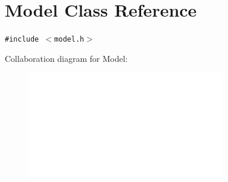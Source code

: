 \hypertarget{classModel}{
\section{Model Class Reference}
\label{classModel}
}
{\tt \#include $<$model.h$>$}

Collaboration diagram for Model:\nopagebreak
\begin{figure}[H]
\begin{center}
\leavevmode
\includegraphics[width=245pt]{classModel__coll__graph}
\end{center}
\end{figure}
